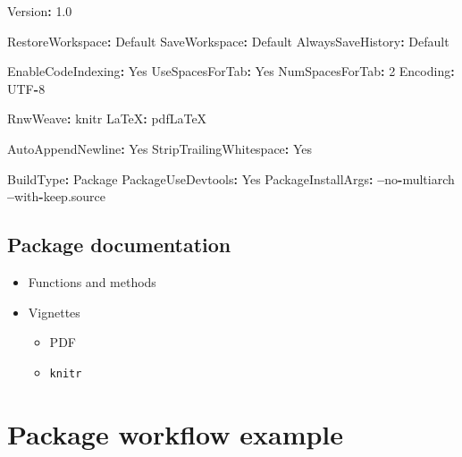 \documentclass[]{book}
\newenvironment{Shaded}{\begin{snugshade}}{\end{snugshade}}
\newcommand{\DecValTok}[1]{\textcolor[rgb]{0.00,0.00,0.81}{#1}}
\newcommand{\FloatTok}[1]{\textcolor[rgb]{0.00,0.00,0.81}{#1}}
\newcommand{\StringTok}[1]{\textcolor[rgb]{0.31,0.60,0.02}{#1}}
\newcommand{\OperatorTok}[1]{\textcolor[rgb]{0.81,0.36,0.00}{\textbf{#1}}}
\newcommand{\NormalTok}[1]{#1}
\providecommand{\tightlist}{%
  \setlength{\itemsep}{0pt}\setlength{\parskip}{0pt}}
\theoremstyle{definition}
\theoremstyle{definition}
\theoremstyle{definition}
\theoremstyle{remark}
\begin{document}
\begin{Shaded}
\begin{Highlighting}[]
\NormalTok{Version}\OperatorTok{:}\StringTok{ }\FloatTok{1.0}

\NormalTok{RestoreWorkspace}\OperatorTok{:}\StringTok{ }\NormalTok{Default}
\NormalTok{SaveWorkspace}\OperatorTok{:}\StringTok{ }\NormalTok{Default}
\NormalTok{AlwaysSaveHistory}\OperatorTok{:}\StringTok{ }\NormalTok{Default}

\NormalTok{EnableCodeIndexing}\OperatorTok{:}\StringTok{ }\NormalTok{Yes}
\NormalTok{UseSpacesForTab}\OperatorTok{:}\StringTok{ }\NormalTok{Yes}
\NormalTok{NumSpacesForTab}\OperatorTok{:}\StringTok{ }\DecValTok{2}
\NormalTok{Encoding}\OperatorTok{:}\StringTok{ }\NormalTok{UTF}\OperatorTok{-}\DecValTok{8}

\NormalTok{RnwWeave}\OperatorTok{:}\StringTok{ }\NormalTok{knitr}
\NormalTok{LaTeX}\OperatorTok{:}\StringTok{ }\NormalTok{pdfLaTeX}

\NormalTok{AutoAppendNewline}\OperatorTok{:}\StringTok{ }\NormalTok{Yes}
\NormalTok{StripTrailingWhitespace}\OperatorTok{:}\StringTok{ }\NormalTok{Yes}

\NormalTok{BuildType}\OperatorTok{:}\StringTok{ }\NormalTok{Package}
\NormalTok{PackageUseDevtools}\OperatorTok{:}\StringTok{ }\NormalTok{Yes}
\NormalTok{PackageInstallArgs}\OperatorTok{:}\StringTok{ }\OperatorTok{--}\NormalTok{no}\OperatorTok{-}\NormalTok{multiarch }\OperatorTok{--}\NormalTok{with}\OperatorTok{-}\NormalTok{keep.source}
\end{Highlighting}
\end{Shaded}

\subsection{Package documentation}\label{package-documentation}

\begin{itemize}
\item
  Functions and methods
\item
  Vignettes

  \begin{itemize}
  \tightlist
  \item
    PDF
  \item
    \texttt{knitr}
  \end{itemize}
\end{itemize}

\section{Package workflow example}\label{package-workflow-example}
\end{document}
